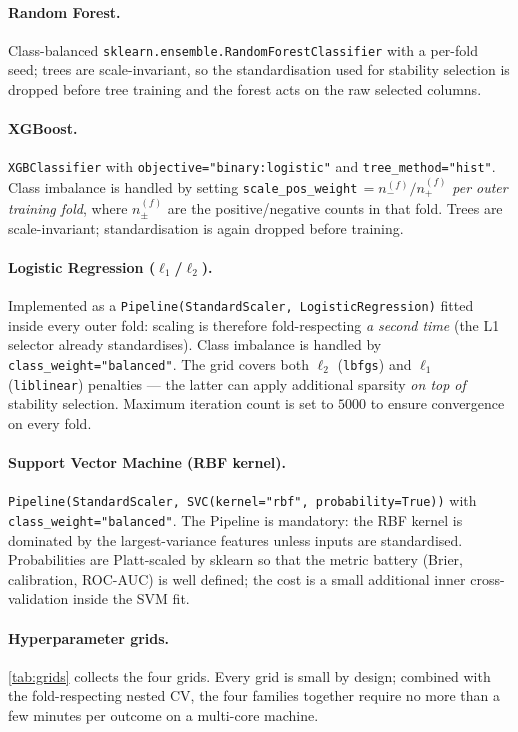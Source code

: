 \documentclass[11pt,a4paper]{article}
\providecommand{\Cref}[1]{\autoref{#1}}
\begin{document}
\paragraph{Random Forest.}
Class-balanced \texttt{sklearn.ensemble.\-RandomForestClassifier} with a
per-fold seed; trees are scale-invariant, so the standardisation used
for stability selection is dropped before tree training and the forest
acts on the raw selected columns.

\paragraph{XGBoost.}
\texttt{XGBClassifier} with \texttt{objective="binary:logistic"} and
\texttt{tree\_method="hist"}. Class imbalance is handled by setting
\texttt{scale\_pos\_weight}$\,= n_-^{(f)}/n_+^{(f)}$ \emph{per outer
training fold}, where $n_\pm^{(f)}$ are the positive/negative counts in
that fold. Trees are scale-invariant; standardisation is again dropped
before training.

\paragraph{Logistic Regression ($\ell_1$/$\ell_2$).}
Implemented as a \texttt{Pipeline(StandardScaler, LogisticRegression)}
fitted inside every outer fold: scaling is therefore fold-respecting
\emph{a second time} (the L1 selector already standardises). Class
imbalance is handled by \texttt{class\_weight="balanced"}. The grid
covers both $\ell_2$ (\texttt{lbfgs}) and $\ell_1$
(\texttt{liblinear}) penalties --- the latter can apply additional
sparsity \emph{on top of} stability selection. Maximum iteration count
is set to $5000$ to ensure convergence on every fold.

\paragraph{Support Vector Machine (RBF kernel).}
\texttt{Pipeline(StandardScaler, SVC(kernel="rbf", probability=True))}
with \texttt{class\_weight="balanced"}. The Pipeline is mandatory: the
RBF kernel is dominated by the largest-variance features unless inputs
are standardised. Probabilities are Platt-scaled by sklearn so that the
metric battery (Brier, calibration, ROC-AUC) is well defined; the cost
is a small additional inner cross-validation inside the SVM fit.

\paragraph{Hyperparameter grids.}
\Cref{tab:grids} collects the four grids. Every grid is small by
design; combined with the fold-respecting nested CV, the four families
together require no more than a few minutes per outcome on a multi-core
machine.
\end{document}
